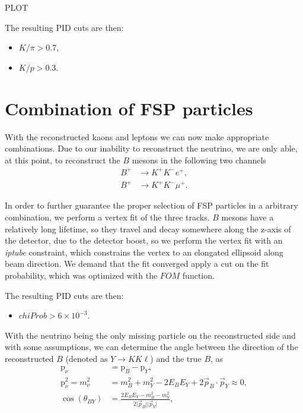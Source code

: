 \documentclass[oneside,a4paper,openany,12pt]{scrbook}
\begin{document}
\begin{center}
PLOT
\end{center}

The resulting PID cuts are then:
\begin{itemize}
\item $K/\pi > 0.7$,
\item $K/p > 0.3$.
\end{itemize}

\section{Combination of FSP particles}

With the reconstructed kaons and leptons we can now make appropriate combinations. Due to our inability to reconstruct the neutrino, we are only able, at this point, to reconstruct the $B$ mesons in the following two channels
\begin{align*}
B^+ &\to K^+ K^- e^+, \\
B^+ &\to K^+ K^- \mu^+.
\end{align*}

In order to further guarantee the proper selection of FSP particles in a arbitrary combination, we perform a vertex fit of the three tracks. $B$ mesons have a relatively long lifetime, so they travel and decay somewhere along the z-axis of the detector, due to the detector boost, so we perform the vertex fit with an \textit{iptube} constraint, which constrains the vertex to an elongated ellipsoid along beam direction. We demand that the fit converged apply a cut on the fit probability, which was optimized with the $FOM$ function.

The resulting PID cuts are then:
\begin{itemize}
\item $chiProb > 6\times 10^{-3}$.
\end{itemize}

With the neutrino being the only missing particle on the reconstructed side and with some assumptions, we can determine the angle between the direction of the reconstructed $B$ (denoted as $Y \to K K \ell$) and the true $B$, as
\begin{align}
\mathrm{p}_\nu &= \mathrm{p}_B - \mathrm{p}_{Y}, \\
\label{eq:massnu}
\mathrm{p}_\nu^2 = m_\nu^2 &= m_B^2 + m_Y^2 - 2E_BE_Y + 2\vec{p}_B \cdot \vec{p}_Y \approx 0, \\ 
\label{eq:cosby}
\cos \left(\theta_{BY}\right) &= \frac{2E_BE_Y - m_B^2 - m_Y^2}{2\vert \vec{p}_B \vert \vert \vec{p}_Y\vert},
\end{align} 
\end{document}
